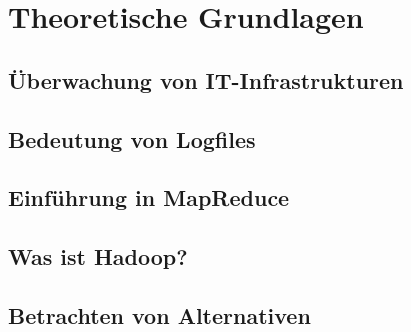 
\chapter{Theoretische Grundlagen}\label{cha:Grundlagen}

\section{Überwachung von IT-Infrastrukturen}\label{sec:UeberwachungIT}

\section{Bedeutung von Logfiles}\label{sec:BedeutungVonLogfiles}

\section{Einführung in MapReduce}\label{sec:EinführungInMapReduce}

\section{Was ist Hadoop?}\label{sec:WasIstHadoop}

\section{Betrachten von Alternativen}